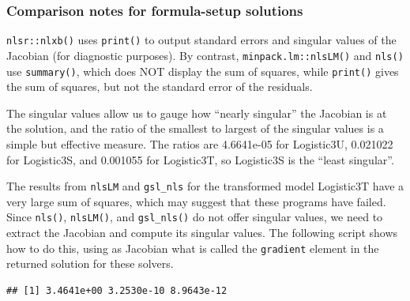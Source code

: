 \documentclass[
]{article}
\newenvironment{Shaded}{\begin{snugshade}}{\end{snugshade}}
\newcommand{\CommentTok}[1]{\textcolor[rgb]{0.56,0.35,0.01}{\textit{#1}}}
\newcommand{\ControlFlowTok}[1]{\textcolor[rgb]{0.13,0.29,0.53}{\textbf{#1}}}
\newcommand{\FunctionTok}[1]{\textcolor[rgb]{0.00,0.00,0.00}{#1}}
\newcommand{\NormalTok}[1]{#1}
\newcommand{\OtherTok}[1]{\textcolor[rgb]{0.56,0.35,0.01}{#1}}
\newcommand{\SpecialCharTok}[1]{\textcolor[rgb]{0.00,0.00,0.00}{#1}}
\newcommand{\StringTok}[1]{\textcolor[rgb]{0.31,0.60,0.02}{#1}}
\begin{document}
\hypertarget{comparison-notes-for-formula-setup-solutions}{%
\subsubsection{Comparison notes for formula-setup
solutions}\label{comparison-notes-for-formula-setup-solutions}}

\texttt{nlsr::nlxb()} uses \texttt{print()} to output standard errors
and singular values of the Jacobian (for diagnostic purposes). By
contrast, \texttt{minpack.lm::nlsLM()} and \texttt{nls()} use
\texttt{summary()}, which does NOT display the sum of squares, while
\texttt{print()} gives the sum of squares, but not the standard error of
the residuals.

The singular values allow us to gauge how ``nearly singular'' the
Jacobian is at the solution, and the ratio of the smallest to largest of
the singular values is a simple but effective measure. The ratios are
4.6641e-05 for Logistic3U, 0.021022 for Logistic3S, and 0.001055 for
Logistic3T, so Logistic3S is the ``least singular''.

The results from \texttt{nlsLM} and \texttt{gsl\_nls} for the
transformed model Logistic3T have a very large sum of squares, which may
suggest that these programs have failed. Since \texttt{nls()},
\texttt{nlsLM()}, and \texttt{gsl\_nls()} do not offer singular values,
we need to extract the Jacobian and compute its singular values. The
following script shows how to do this, using as Jacobian what is called
the \texttt{gradient} element in the returned solution for these
solvers.

\begin{Shaded}
\end{Shaded}

\begin{verbatim}
## [1] 3.4641e+00 3.2530e-10 8.9643e-12
\end{verbatim}
\end{document}
